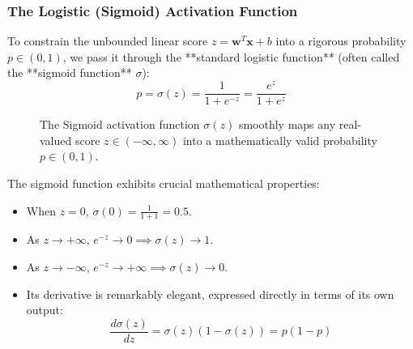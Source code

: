 \subsubsection{The Logistic (Sigmoid) Activation Function}
To constrain the unbounded linear score $z = \mathbf{w}^T \mathbf{x} + b$ into a rigorous probability $p \in (0, 1)$, we pass it through the **standard logistic function** (often called the **sigmoid function** $\sigma$):
\begin{equation}
p = \sigma(z) = \frac{1}{1 + e^{-z}} = \frac{e^z}{1 + e^z}\label{eq:sigmoid_def}
\end{equation}

\begin{figure}[htbp]
\centering
{}
\caption{The Sigmoid activation function $\sigma(z)$ smoothly maps any real-valued score $z \in (-\infty, \infty)$ into a mathematically valid probability $p \in (0, 1)$.}\label{fig:sigmoid_curve}
\end{figure}

The sigmoid function exhibits crucial mathematical properties:
\begin{itemize}
    \item When $z = 0$, $\sigma(0) = \frac{1}{1 + 1} = 0.5$.
    \item As $z \to +\infty$, $e^{-z} \to 0 \implies \sigma(z) \to 1$.
    \item As $z \to -\infty$, $e^{-z} \to +\infty \implies \sigma(z) \to 0$.
    \item Its derivative is remarkably elegant, expressed directly in terms of its own output:
    \begin{equation}
    \frac{d\sigma(z)}{dz} = \sigma(z)\left( 1 - \sigma(z) \right) = p(1 - p)\label{eq:sigmoid_derivative}
    \end{equation}
\end{itemize}

